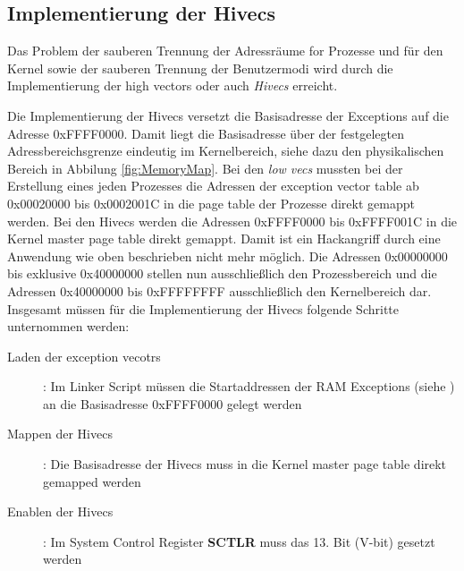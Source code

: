 \subsection{Implementierung der Hivecs}

Das Problem der sauberen Trennung der Adressräume for Prozesse und für den Kernel sowie der sauberen Trennung der Benutzermodi wird durch die Implementierung der high vectors oder auch \emph{Hivecs} erreicht.

Die Implementierung der Hivecs versetzt die Basisadresse der Exceptions auf die Adresse 0xFFFF0000. Damit liegt die Basisadresse über der festgelegten Adressbereichsgrenze eindeutig im Kernelbereich, siehe dazu den physikalischen Bereich in Abbilung \ref{fig:MemoryMap}. Bei den \emph{low vecs} mussten bei der Erstellung eines jeden Prozesses die Adressen der exception vector table ab 0x00020000 bis 0x0002001C in die page table der Prozesse direkt gemappt werden. Bei den Hivecs werden die Adressen 0xFFFF0000 bis 0xFFFF001C in die Kernel master page table direkt gemappt. Damit ist ein Hackangriff durch eine Anwendung wie oben beschrieben nicht mehr möglich. Die Adressen 0x00000000 bis exklusive 0x40000000 stellen nun ausschließlich den Prozessbereich und die Adressen 0x40000000 bis 0xFFFFFFFF ausschließlich den Kernelbereich dar.
Insgesamt müssen für die Implementierung der Hivecs folgende Schritte unternommen werden:

\begin{description}
	\item[Laden der exception vecotrs]: Im Linker Script müssen die Startaddressen der RAM Exceptions (siehe \cite[S. 4100]{ARM:TRM}) an die Basisadresse 0xFFFF0000 gelegt werden
	\item[Mappen der Hivecs]: Die Basisadresse der Hivecs muss in die Kernel master page table direkt gemapped werden
	\item[Enablen der Hivecs]: Im System Control Register \textbf{SCTLR} muss das 13. Bit (V-bit) gesetzt werden \cite[S. 1164]{ARM:ARM} 
\end{description}
\pagebreak 
